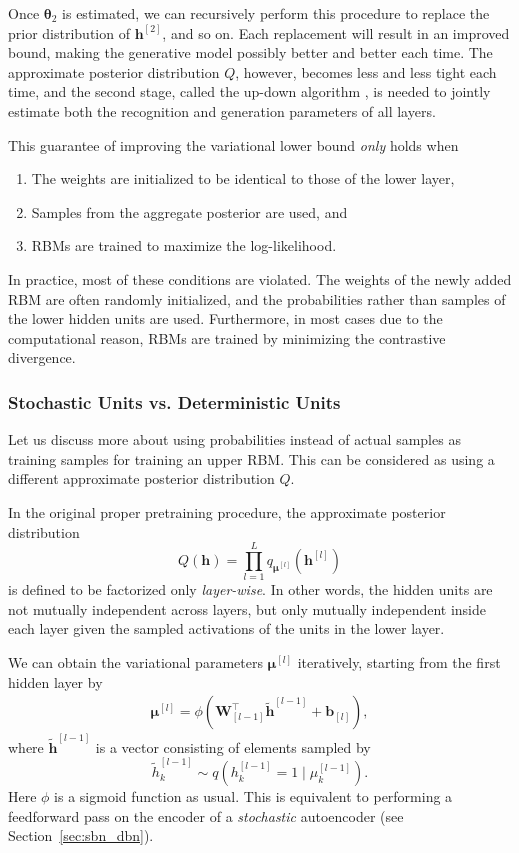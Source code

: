 \documentclass{now}
\newcommand{\qlay}[1]{\left[#1\right]}
\newcommand{\vect}[1]{\mathbf{#1}}
\newcommand{\vects}[1]{\boldsymbol{#1}}
\newcommand{\matr}[1]{\mathbf{#1}}
\newcommand{\vb}[0]{\vect{b}}
\newcommand{\vh}[0]{\vect{h}}
\newcommand{\mW}[0]{\matr{W}}
\newcommand{\vmu}[0]{\vects{\mu}}
\newcommand{\TT}[0]{{\vects{\theta}}}
\begin{document}
Once $\TT_2$ is estimated, we can recursively perform this
procedure to replace the prior distribution of
$\vh^{\qlay{2}}$, and so on.  Each replacement will result
in an improved bound, making the generative model possibly
better and better each time.  The approximate posterior
distribution $Q$, however, becomes less and less tight each
time, and the second stage, called the up-down algorithm
\citep{Hinton2006nc}, is needed to jointly estimate both the
recognition and generation parameters of all layers.  

This guarantee of improving the variational lower bound
\textit{only} holds when
\begin{enumerate}
        \vspace{-5mm}
    \itemsep 0em
    \item The weights are initialized to be identical to
        those of the lower layer,
    \item Samples from the aggregate posterior are used, and
    \item RBMs are trained to maximize the log-likelihood.
\end{enumerate}

In practice, most of these conditions are violated. The weights
of the newly added RBM are often randomly initialized, and
the probabilities rather than samples of the lower hidden
units are used. Furthermore, in most cases due to the
computational reason, RBMs are trained by minimizing the
contrastive divergence. 

\subsubsection{Stochastic Units vs. Deterministic Units}
\label{sec:det_vs_sto}

Let us discuss more about using probabilities
instead of actual samples as training samples for training
an upper RBM. This can be considered as using a different
approximate posterior distribution $Q$.

In the original proper pretraining procedure, the
approximate posterior distribution
\[
Q(\vh) = \prod_{l=1}^L q_{\vmu^{\qlay{l}}}\left(
\vh^{\qlay{l}} \right)
\]
is defined to be factorized only \textit{layer-wise}. In
other words, the hidden units are not mutually independent
across layers, but only mutually independent inside each
layer given the sampled activations of the units in the
lower layer.

We can obtain the variational parameters
$\vmu^{\qlay{l}}$ iteratively, starting from the first hidden
layer by
\begin{align}
    \label{eq:dbn_posterior}
    \vmu^{\qlay{l}} = \phi\left( \mW_{\qlay{l-1}}^\top
    \tilde{\vh}^{\qlay{l-1}} + \vb_{\qlay{l}} \right),
\end{align}
where $\tilde{\vh}^{\qlay{l-1}}$ is a vector consisting of
elements sampled by 
\[
\tilde{h}_k^{\qlay{l-1}} \sim q\left(h_k^{\qlay{l-1}} = 1 \mid
\mu_k^{\qlay{l-1}}\right).
\]
Here $\phi$ is a sigmoid function as usual. This is
equivalent to performing a feedforward pass on the encoder
of a \textit{stochastic} autoencoder (see
Section~\ref{sec:sbn_dbn}).
\end{document}
